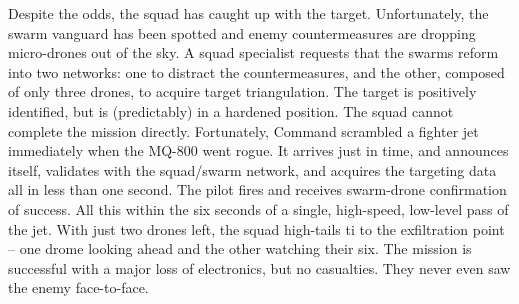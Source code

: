 Despite the odds, the squad has caught up with the target.
Unfortunately, the swarm vanguard has been spotted and enemy countermeasures are dropping micro-drones out of the sky.
A squad specialist requests that the swarms reform into two networks: one to distract the countermeasures, and the other, composed of only three drones, to acquire target triangulation.
The target is positively identified, but is (predictably) in a hardened position.
The squad cannot complete the mission directly.
Fortunately, Command scrambled a fighter jet immediately when the MQ-800 went rogue.
It arrives just in time, and announces itself, validates with the squad/swarm network, and acquires the targeting data all in less than one second.
The pilot fires and receives swarm-drone confirmation of success.
All this within the six seconds of a single, high-speed, low-level pass of the jet.
With just two drones left, the squad high-tails ti to the exfiltration point -- one drome looking ahead and the other watching their six.
The mission is successful with a major loss of electronics, but no casualties.
They never even saw the enemy face-to-face.
